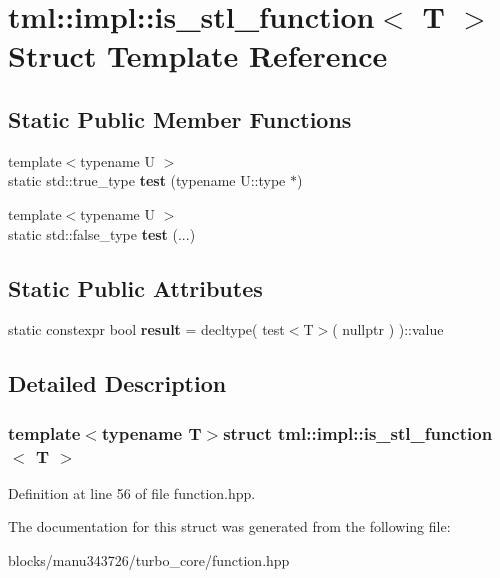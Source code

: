 \hypertarget{structtml_1_1impl_1_1is__stl__function}{\section{tml\+:\+:impl\+:\+:is\+\_\+stl\+\_\+function$<$ T $>$ Struct Template Reference}
\label{structtml_1_1impl_1_1is__stl__function}
}
\subsection*{Static Public Member Functions}
\begin{DoxyCompactItemize}
\item 
\hypertarget{structtml_1_1impl_1_1is__stl__function_ae8f7024c59465557d430bab21cbda7e4}{{\footnotesize template$<$typename U $>$ }\\static std\+::true\+\_\+type {\bfseries test} (typename U\+::type $\ast$)}\label{structtml_1_1impl_1_1is__stl__function_ae8f7024c59465557d430bab21cbda7e4}

\item 
\hypertarget{structtml_1_1impl_1_1is__stl__function_a5caafb32399a9015ffcfaa0d72b5f16e}{{\footnotesize template$<$typename U $>$ }\\static std\+::false\+\_\+type {\bfseries test} (...)}\label{structtml_1_1impl_1_1is__stl__function_a5caafb32399a9015ffcfaa0d72b5f16e}

\end{DoxyCompactItemize}
\subsection*{Static Public Attributes}
\begin{DoxyCompactItemize}
\item 
\hypertarget{structtml_1_1impl_1_1is__stl__function_a08615543c4db213603e62acda2dc1fc7}{static constexpr bool {\bfseries result} = decltype( test$<$T$>$( nullptr ) )\+::value}\label{structtml_1_1impl_1_1is__stl__function_a08615543c4db213603e62acda2dc1fc7}

\end{DoxyCompactItemize}


\subsection{Detailed Description}
\subsubsection*{template$<$typename T$>$struct tml\+::impl\+::is\+\_\+stl\+\_\+function$<$ T $>$}



Definition at line 56 of file function.\+hpp.



The documentation for this struct was generated from the following file\+:\begin{DoxyCompactItemize}
\item 
blocks/manu343726/turbo\+\_\+core/function.\+hpp\end{DoxyCompactItemize}

